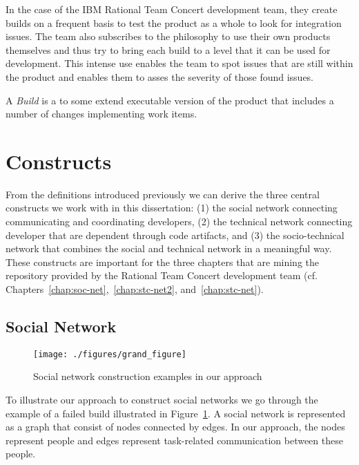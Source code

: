 In the case of the IBM Rational Team Concert development team, they create builds on a frequent basis to test the product as a whole to look for integration issues. 
The team also subscribes to the philosophy to use their own products themselves and thus try to bring each build to a level that it can be used for development.
This intense use enables the team to spot issues that are still within the product and enables them to asses the severity of those found issues.

\begin{note}
\begin{mydef}
A \emph{Build} is a to some extend executable version of the product that includes a number of changes implementing work items.
\end{mydef}
\end{note}

\section{Constructs}
\label{c5:sec:constructs}
From the definitions introduced previously we can derive the three central constructs we work with in this dissertation: (1) the social network connecting communicating and coordinating developers, (2) the technical network connecting developer that are dependent through code artifacts, and (3) the socio-technical network that combines the social and technical network in a meaningful way.
These constructs are important for the three chapters that are mining the repository provided by the Rational Team Concert development team (cf. Chapters~\ref{chap:soc-net},~\ref{chap:stc-net2}, and~\ref{chap:stc-net}).

\subsection{Social Network}
\begin{figure}[t!]
\begin{center}
\texttt{[image: ./figures/grand\_figure]}
\caption{Social network construction examples in our approach}
\label{fig:network}
\end{center}
\end{figure}
To illustrate our approach to construct social networks we go through the example of a failed build illustrated in Figure~\ref{fig:network}. 
A social network is represented as a graph that consist of nodes connected by edges. 
In our approach, the nodes represent people and edges represent task-related communication between these people.

